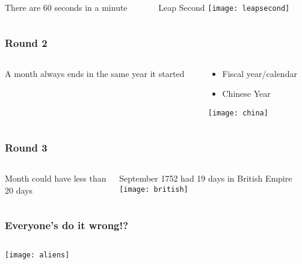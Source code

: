 \documentclass[aspectratio=169, 15pt,usenames,dvipsnames]{beamer}
\begin{document}
{	\begin{gdblank}
		\begin{columns}
			\begin{column}{0.70\textwidth}
				\centering
				\LARGE There are 60 seconds in a minute 
				\pause     
			\end{column}
			\begin{column}{0.3\textwidth}
				\large\centering Leap Second
				\vskip0.5cm
				\texttt{[image: leapsecond]}
			\end{column}
		\end{columns}
	\end{gdblank}
	\begin{gdblank}
		\frametitle{Round 2}    
		\begin{columns}
			\begin{column}{0.70\textwidth}
				\centering
				\LARGE A month always ends in the same year it started
				\pause     
			\end{column}
			\begin{column}{0.3\textwidth}
				\large\centering 
				\begin{itemize}
					\item Fiscal year/calendar
					\item Chinese Year
				\end{itemize}
				\vskip0.5cm
				\texttt{[image: china]}
			\end{column}
		\end{columns}
	\end{gdblank} 
	\begin{gdblank}
		\frametitle{Round 3}    
		\begin{columns}
			\begin{column}{0.70\textwidth}
				\centering
				\LARGE Month could have less than 20 days
				\pause     
			\end{column}
			\begin{column}{0.3\textwidth}
				\large\centering  September 1752 had 19 days in British Empire
				\vskip0.5cm
				\texttt{[image: british]}
			\end{column}
		\end{columns}
	\end{gdblank} 
	\begin{gdblank}
		\frametitle{Everyone's do it wrong!?}
		\centering{\fontsize{140pt}{150pt}\selectfont\bf ?}
	\end{gdblank}   
	\begin{gdblank}
		\begin{columns}
			\begin{column}{0.5\textwidth}
				\texttt{[image: aliens]}				


\end{column}
\end{columns}
\end{gdblank}}
\end{document}

